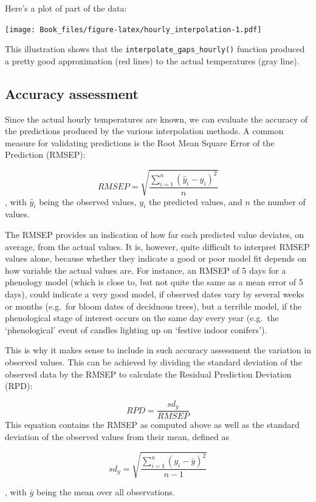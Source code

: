 \documentclass[
]{book}
\begin{document}
Here's a plot of part of the data:

\texttt{[image: Book\_files/figure-latex/hourly\_interpolation-1.pdf]}

This illustration shows that the \texttt{interpolate\_gaps\_hourly()} function produced a pretty good approximation (red lines) to the actual temperatures (gray line).

\hypertarget{accuracy-assessment}{%
\subsection{Accuracy assessment}\label{accuracy-assessment}}

Since the actual hourly temperatures are known, we can evaluate the accuracy of the predictions produced by the various interpolation methods. A common measure for validating predictions is the Root Mean Square Error of the Prediction (RMSEP):

\[RMSEP=\sqrt{\frac{\sum_{i=1}^n(\hat{y}_i-y_i)^2}{n}}\], with \(\hat{y}_i\) being the observed values, \(y_i\) the predicted values, and \(n\) the number of values.

The RMSEP provides an indication of how far each predicted value deviates, on average, from the actual values. It is, however, quite difficult to interpret RMSEP values alone, because whether they indicate a good or poor model fit depends on how variable the actual values are. For instance, an RMSEP of 5 days for a phenology model (which is close to, but not quite the same as a mean error of 5 days), could indicate a very good model, if observed dates vary by several weeks or months (e.g.~for bloom dates of deciduous trees), but a terrible model, if the phenological stage of interest occurs on the same day every year (e.g.~the `phenological' event of candles lighting up on `festive indoor conifers').

This is why it makes sense to include in such accuracy assessment the variation in observed values. This can be achieved by dividing the standard deviation of the observed data by the RMSEP to calculate the Residual Prediction Deviation (RPD):

\[RPD=\frac{sd_y}{RMSEP}\]
This equation contains the RMSEP as computed above as well as the standard deviation of the observed values from their mean, defined as

\[sd_y=\sqrt{\frac{\sum_{i=1}^n(y_i-\bar{y})^2}{n-1}}\]

, with \(\bar{y}\) being the mean over all observations.
\end{document}

